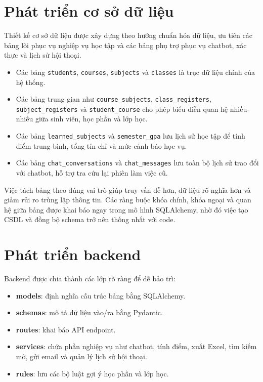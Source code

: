 \documentclass[12pt,a4paper]{report}
\begin{document}
\section{Phát triển cơ sở dữ liệu}
Thiết kế cơ sở dữ liệu được xây dựng theo hướng chuẩn hóa dữ liệu, ưu tiên các bảng lõi phục vụ nghiệp vụ học tập và các bảng phụ trợ phục vụ chatbot, xác thực và lịch sử hội thoại.

\begin{itemize}
    \item Các bảng \texttt{students}, \texttt{courses}, \texttt{subjects} và \texttt{classes} là trục dữ liệu chính của hệ thống.
    \item Các bảng trung gian như \texttt{course\_subjects}, \texttt{class\_registers}, \texttt{subject\_registers} và \texttt{student\_course} cho phép biểu diễn quan hệ nhiều-nhiều giữa sinh viên, học phần và lớp học.
    \item Các bảng \texttt{learned\_subjects} và \texttt{semester\_gpa} lưu lịch sử học tập để tính điểm trung bình, tổng tín chỉ và mức cảnh báo học vụ.
    \item Các bảng \texttt{chat\_conversations} và \texttt{chat\_messages} lưu toàn bộ lịch sử trao đổi với chatbot, hỗ trợ tra cứu lại phiên làm việc cũ.
\end{itemize}

Việc tách bảng theo đúng vai trò giúp truy vấn dễ hơn, dữ liệu rõ nghĩa hơn và giảm rủi ro trùng lặp thông tin. Các ràng buộc khóa chính, khóa ngoại và quan hệ giữa bảng được khai báo ngay trong mô hình SQLAlchemy, nhờ đó việc tạo CSDL và đồng bộ schema trở nên thống nhất với code.

\section{Phát triển backend}
Backend được chia thành các lớp rõ ràng để dễ bảo trì:
\begin{itemize}
    \item \textbf{models}: định nghĩa cấu trúc bảng bằng SQLAlchemy.
    \item \textbf{schemas}: mô tả dữ liệu vào/ra bằng Pydantic.
    \item \textbf{routes}: khai báo API endpoint.
    \item \textbf{services}: chứa phần nghiệp vụ như chatbot, tính điểm, xuất Excel, tìm kiếm mờ, gửi email và quản lý lịch sử hội thoại.
    \item \textbf{rules}: lưu các bộ luật gợi ý học phần và lớp học.
\end{itemize}
\end{document}

